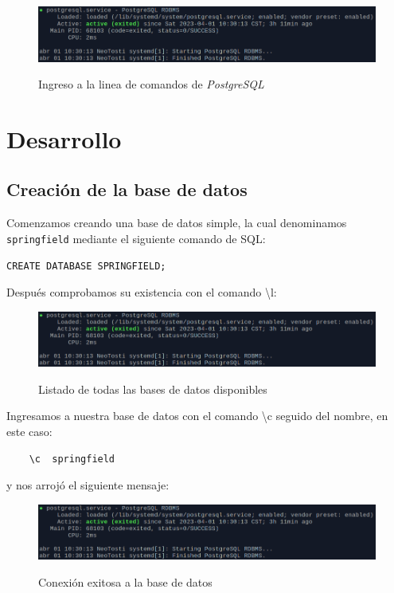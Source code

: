 \documentclass[a4paper,12pt]{article}
\begin{document}
\begin{figure}[!h]
\centering
	\includegraphics[width=.7\textwidth]{fig1}
	\label{fig2}
	 \caption{Ingreso a la linea de comandos de \emph{PostgreSQL}}
\end{figure}


\section{Desarrollo}

\subsection{Creación de la base de datos}

Comenzamos creando una base de datos simple, la cual denominamos \texttt{springfield} mediante el siguiente comando de SQL:

\begin{lstlisting}
CREATE DATABASE SPRINGFIELD;
\end{lstlisting}

Después comprobamos su existencia con el comando \textbackslash l:

\begin{figure}[!h]
\centering
	\includegraphics[width=.7\textwidth]{fig1}
	\label{fig3}
	 \caption{Listado de todas las bases de datos disponibles}
\end{figure}

Ingresamos a nuestra base de datos con el comando \textbackslash c seguido del nombre, en este caso:

\begin{lstlisting}
	\c 	springfield
\end{lstlisting}

y nos arrojó el siguiente mensaje:\\

\begin{figure}[!h]
\centering
	\includegraphics[width=.7\textwidth]{fig1}
	\label{fig4}
	 \caption{Conexión exitosa a la base de datos}
\end{figure}
\end{document}
